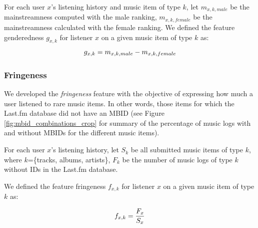 	For each user $x$'s listening history and music item of type $k$, let
	$m_{x,k,male}$ be the mainstreamness computed with the male ranking,
	$m_{x,k,female}$ be the mainstreamness calculated with the female ranking.
   We defined the feature genderedness $g_{x,k}$ for listener $x$ on a given music item of type $k$ as:
          \vspace{1em}
			\begin{equation}
			\abovedisplayskip=2pt plus 3pt minus 9pt
			\label{eq:genderedness}
			g_{x,k}=m_{x,k,male} - m_{x,k,female}
		\end{equation}


\subsubsection{Fringeness}
We developed the \emph{fringeness} feature with the objective of expressing how much a user listened to rare music items. In other words, those items for which the Last.fm database did not have an MBID (see Figure \ref{fig:mbid_combinations_crop} for summary of the percentage of music logs with and without MBIDs for the different music items).



	For each user $x$'s listening history, let 
    $S_k$ be all submitted music items of type $k$, where $k$=\{tracks, albums, artists\},
	$F_k$ be the number of music logs of type $k$ without IDs in the Last.fm database.
    
    We defined the feature fringeness $f_{x,k}$ for listener $x$ on a given music item of type $k$ as:

	\begin{equation}
		\abovedisplayskip=2pt plus 3pt minus 9pt
		f_{x,k} = \frac{F_x}{S_x}
	\end{equation}















